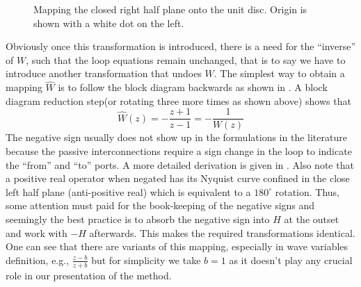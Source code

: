 \begin{figure}%
\centering
{}
\caption[Mapping the closed right half plane onto the unit disc.]%
{Mapping the closed right half plane onto the unit disc. Origin is shown with a white dot on the left.}%
\label{fig:lit:smith}%
\end{figure}

Obviously once this transformation is introduced, there is a need for the ``inverse'' of $W$, such that the
loop equations remain unchanged, that is to say we have to introduce another transformation that undoes
$W$. The simplest way to obtain a mapping $\hat{W}$ is to follow the block diagram backwards as shown in 
. A block diagram reduction step(or rotating three more times as shown above) shows that 
\[
\hat{W}(z) = -\frac{z+1}{z-1} = -\frac{1}{W(z)}
\]
The negative sign usually does not show up in the formulations in the literature because the passive interconnections 
require a sign change in the loop to indicate the ``from'' and ``to'' ports. A more detailed derivation
is given in \cite{colgate3}. Also note that a positive real operator when negated has its Nyquist curve 
confined in the close left half plane (anti-positive real) which is equivalent to a $180^\circ$ rotation. 
Thus, some attention must paid for the book-keeping of the negative signs and seemingly the best practice
is to absorb the negative sign into $H$ at the outset and work with $-H$ afterwards. This makes the required
transformations identical. One can see that there are variants of this mapping, especially in wave variables 
definition, e.g., $\frac{z-b}{z+b}$ but for simplicity we take $b=1$ as it doesn't play any crucial role 
in our presentation of the method. 


